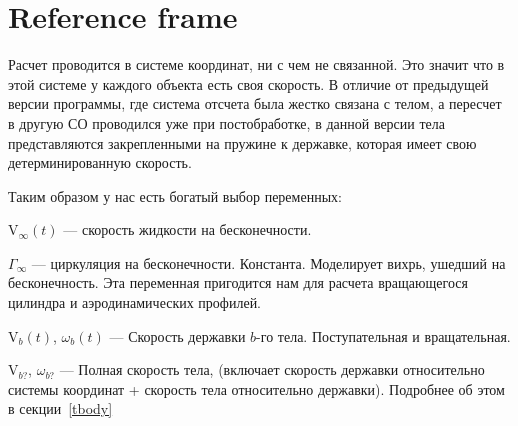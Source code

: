 \documentclass[14pt]{extreport}
\newcommand{\comment}[1]{}
\newcommand{\br}[1]{\boldsymbol{\mathrm{#1}}}
\newenvironment{packed_itemize}{
\begin{itemize}
  \setlength{\itemsep}{1pt}
  \setlength{\parskip}{0pt}
  \setlength{\parsep}{0pt}
}{\end{itemize}}
\begin{document}
\section{Reference frame}
\label{refframe}
Расчет проводится в системе координат, ни с чем не связанной. Это значит что в этой системе у каждого объекта есть своя скорость. В отличие от предыдущей версии программы, где система отсчета была жестко связана с телом, а пересчет в другую СО проводился уже при постобработке, в данной версии тела представляются закрепленными на пружине к державке, которая имеет свою детерминированную скорость.

Таким образом у нас есть богатый выбор переменных:
\begin{packed_itemize}
\item $\br V_\infty(t)$ --- скорость жидкости на бесконечности.
\item $\Gamma_{\infty}$ --- циркуляция на бесконечности. Константа. Моделирует вихрь, ушедший на бесконечность. Эта переменная пригодится нам для расчета вращающегося цилиндра и аэродинамических профилей.
\item $\br V_b(t)$, $\omega_b(t)$ --- Скорость державки $b$-го тела. Поступательная и вращательная.
\item $\br V_{b?}$, $\omega_{b?}$ --- Полная скорость тела, (включает скорость державки относительно системы координат + скорость тела относительно державки). Подробнее об этом в секции~\ref{tbody}
\end{packed_itemize}

\comment{Система координат используется правая. Это значит, если вы рисуете ось $Ox$ слева на право, а ось $Oy$ снизу вверх, то положительным направлением вращения будет являться вращение против часовой стрелки.

Помимо основной системы координат, имеется так же система координат тела: $Ox_b y_b$. С основной системой координат она связана выражением
\begin{equation*}
\br r = \br r_c + \left(\begin{array}{cc}
\cos(\alpha) & -\sin(\alpha) \\
sin(\alpha) & \cos(\alpha) \end{array}\right) \cdot \br r_b
\end{equation*}
Центр поворота жестко связан с центром системы $Ox_b y_b$. Это нужно учитывать при загрузке тела. Система осчета тела используется только при загрузке. Везде внутри комплекса координаты тела записываются в основной системе. 
\begin{center}\end{center}
}
\end{document}
